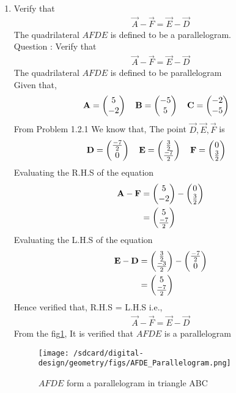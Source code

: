 \documentclass[11pt]{book}
\begin{document}
\begin{enumerate}[label=\thesection.\arabic*.,ref=\thesection.\theenumi]
\item Verify that 
		\begin{align}
\vec{A}-\vec{F}=\vec{E}-\vec{D}
		\end{align}
The quadrilateral $AFDE$ is defined to be a parallelogram.\\
Question : Verify that 
\begin{align}
	\vec{A}-\vec{F} = \vec{E}-\vec{D}
\end{align}
The quadrilateral $AFDE$ is defined to be parallelogram
\\ \solution 
Given that,
\begin{align}
    \mathbf{A} = \begin{pmatrix}5\\-2\end{pmatrix}
    \quad
    \mathbf{B} &= \begin{pmatrix}-5\\5\end{pmatrix}
    \quad
    \mathbf{C} = \begin{pmatrix}-2\\-5\end{pmatrix}
\end{align}
From Problem 1.2.1 We know that, The point $\vec{D},\vec{E},\vec{F}$ is 
\begin{align}
    \mathbf{D} = \begin{pmatrix}\frac{-7}{2}\\ 0 \end{pmatrix}
    \quad
    \mathbf{E} &= \begin{pmatrix}\frac{3}{2}\\ \frac{-7}{2}\end{pmatrix}
    \quad
    \mathbf{F} = \begin{pmatrix}0\\ \frac{3}{2}\end{pmatrix}
\end{align}
Evaluating the R.H.S of the equation
\begin{align}
    \mathbf{A}-\mathbf{F}&=\begin{pmatrix}5\\-2\end{pmatrix}-\begin{pmatrix}0\\  \frac{3}{2} \end{pmatrix}\\
    &=\begin{pmatrix} 5 \\ \frac{-7}{2} \end{pmatrix}
\end{align} 
Evaluating the L.H.S of the equation
\begin{align}
    \mathbf{E}-\mathbf{D}&=\begin{pmatrix}\frac{3}{2}\\ \frac{-3}{2}\end{pmatrix}-\begin{pmatrix}\frac{-7}{2}\\ 0 \end{pmatrix}\\
    &=\begin{pmatrix}5 \\ \frac{-7}{2} \end{pmatrix}
\end{align}
Hence verified that, R.H.S = L.H.S i.e.,
\begin{align}
	\vec{A}-\vec{F} = \vec{E}-\vec{D}
\end{align}
From the fig\ref{fig:Triangle}, It is verified that $AFDE$ is a parallelogram
\begin{figure}
\centering
\texttt{[image: /sdcard/digital-design/geometry/figs/AFDE\_Parallelogram.png]}
\caption{$AFDE$ form a parallelogram in triangle ABC}
\label{fig:Triangle}
\end{figure}
\end{enumerate}
\end{document}
